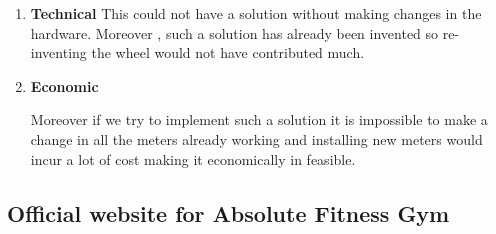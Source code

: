 \documentclass[fleqn,10pt]{../SelfArx} %
\begin{document}
\begin{enumerate}
\item \textbf{Technical}
This could not have a solution without making changes in the hardware. Moreover , such a solution has already been invented so re-inventing the wheel would not have contributed much.

\item \textbf{Economic}

Moreover if we try to implement such a solution it is  impossible to make a change in all the meters already working and installing new meters would incur a lot of cost making it economically in feasible.
\end{enumerate}

\subsection {Official website for Absolute Fitness Gym}
\end{document}
